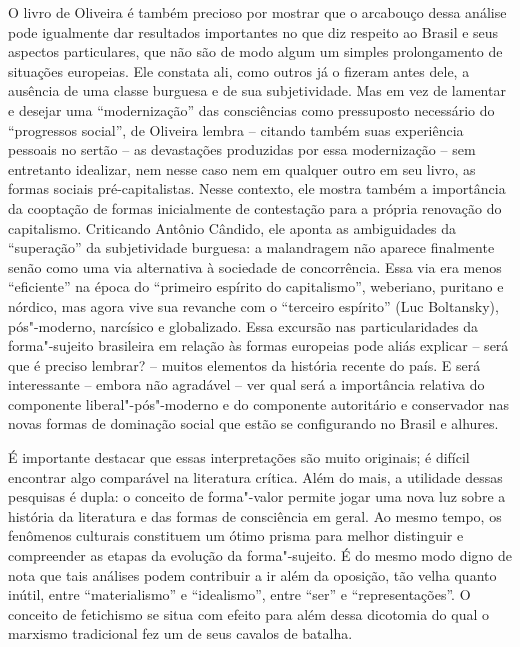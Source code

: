 O livro de Oliveira é também precioso por mostrar que o arcabouço dessa
análise pode igualmente dar resultados importantes no que diz respeito
ao Brasil e seus aspectos particulares, que não são de modo algum um
simples prolongamento de situações europeias. Ele constata ali, como
outros já o fizeram antes dele, a ausência de uma classe burguesa e de
sua subjetividade. Mas em vez de lamentar e desejar uma ``modernização''
das consciências como pressuposto necessário do ``progressos social'',
de Oliveira lembra -- citando também suas experiência pessoais no sertão
-- as devastações produzidas por essa modernização -- sem entretanto
idealizar, nem nesse caso nem em qualquer outro em seu livro, as formas
sociais pré-capitalistas. Nesse contexto, ele mostra também a
importância da cooptação de formas inicialmente de contestação para a
própria renovação do capitalismo. Criticando Antônio Cândido, ele aponta
as ambiguidades da ``superação'' da subjetividade burguesa: a
malandragem não aparece finalmente senão como uma via alternativa à
sociedade de concorrência. Essa via era menos ``eficiente'' na época do
``primeiro espírito do capitalismo'', weberiano, puritano e nórdico, mas
agora vive sua revanche com o ``terceiro espírito'' (Luc Boltansky),
pós"-moderno, narcísico e globalizado. Essa excursão nas particularidades
da forma"-sujeito brasileira em relação às formas europeias pode aliás
explicar -- será que é preciso lembrar? -- muitos elementos da história
recente do país. E será interessante -- embora não agradável -- ver qual
será a importância relativa do componente liberal"-pós"-moderno e do
componente autoritário e conservador nas novas formas de dominação
social que estão se configurando no Brasil e alhures.

É importante destacar que essas interpretações são muito originais; é
difícil encontrar algo comparável na literatura crítica. Além do mais, a
utilidade dessas pesquisas é dupla: o conceito de forma"-valor permite
jogar uma nova luz sobre a história da literatura e das formas de
consciência em geral. Ao mesmo tempo, os fenômenos culturais constituem
um ótimo prisma para melhor distinguir e compreender as etapas da
evolução da forma"-sujeito. É do mesmo modo digno de nota que tais
análises podem contribuir a ir além da oposição, tão velha quanto
inútil, entre ``materialismo'' e ``idealismo'', entre ``ser'' e
``representações''. O conceito de fetichismo se situa com efeito para
além dessa dicotomia do qual o marxismo tradicional fez um de seus
cavalos de batalha.

